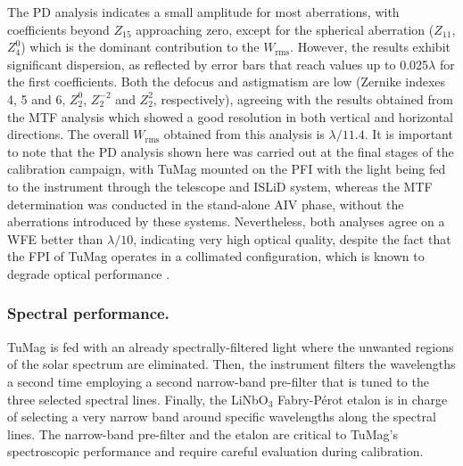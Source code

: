 The PD analysis indicates a small amplitude for most aberrations, with coefficients beyond $Z_15$ approaching zero, except for the spherical aberration ($Z_{11}$, $Z_4 ^0$) which is the dominant contribution to the $W_{\text{rms}}$. However, the results exhibit significant dispersion, as reflected by error bars that reach values up to 0.025$\lambda$ for the first coefficients. Both the defocus and astigmatism are low (Zernike indexes 4, 5 and 6, $Z _ 2 ^0$, $Z _ 2 ^{-2}$ and $Z _ 2 ^2$, respectively), agreeing with the results obtained from the MTF analysis which showed a good resolution in both vertical and horizontal directions. The overall $W_{\text{rms}}$ obtained from this analysis is $\lambda / 11.4$. It is important to note that the PD analysis shown here was carried out at the final stages of the calibration campaign, with TuMag mounted on the PFI with the light being fed to the instrument through the telescope and ISLiD system, whereas the MTF determination was conducted in the stand-alone AIV phase, without the aberrations introduced by these systems. Nevertheless, both analyses agree on a WFE better than $\lambda / 10$, indicating very high optical quality, despite the fact that the FPI of TuMag operates in a collimated configuration, which is known to degrade optical performance \citep{ghosts-etalon}.

\subsubsection{Spectral performance.}

TuMag is fed with an already spectrally-filtered light where the unwanted regions of the solar spectrum are eliminated.  Then, the instrument filters the wavelengths a second time employing a second narrow-band pre-filter that is tuned to the three selected spectral lines. Finally, the LiNbO$_3$ Fabry-Pérot etalon is in charge of selecting a very narrow band around specific wavelengths along the spectral lines. The narrow-band pre-filter and the etalon are critical to TuMag's spectroscopic performance and require careful evaluation during calibration.

